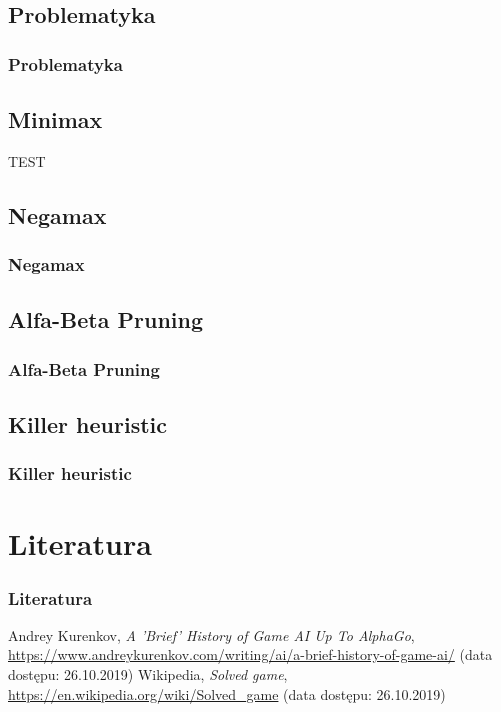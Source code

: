 \documentclass[polish,envcountsect,10pt]{beamer}
\begin{document}
        \subsection{Problematyka}
            \begin{frame}
               \frametitle{Problematyka} 
            \end{frame}
        \subsection{Minimax}
            \begin{frame}
                \begin{algorithm}[H]
                \caption{TEST}
                \end{algorithm}
            \end{frame}
        \subsection{Negamax}
            \begin{frame}
                \frametitle{Negamax}
            \end{frame}
        \subsection{Alfa-Beta Pruning}
            \begin{frame}
                \frametitle{Alfa-Beta Pruning}
            \end{frame}
        \subsection{Killer heuristic}
            \begin{frame}
                \frametitle{Killer heuristic}
            \end{frame}
    \section{Literatura}
        \begin{frame}
            \frametitle{Literatura}
            \begin{thebibliography}{9}
                Andrey Kurenkov, \emph{A 'Brief' History of Game AI Up To AlphaGo}, \url{https://www.andreykurenkov.com/writing/ai/a-brief-history-of-game-ai/} (data dostępu: 26.10.2019)
                Wikipedia, \emph{Solved game}, \url{https://en.wikipedia.org/wiki/Solved_game} (data dostępu: 26.10.2019)
            \end{thebibliography}
        \end{frame}
\end{document}
